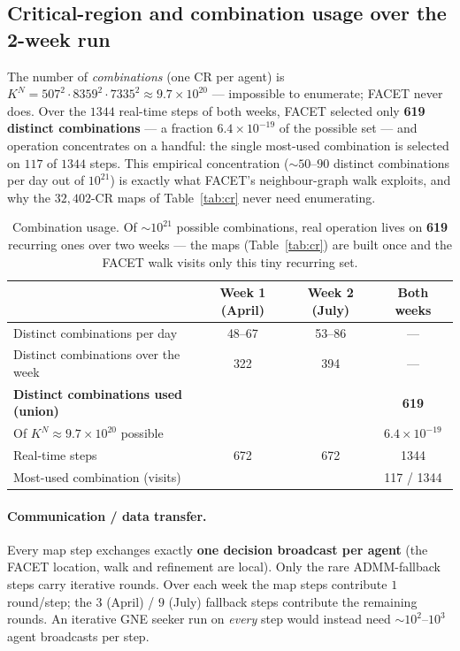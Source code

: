 \documentclass[11pt, letterpaper]{article}
\begin{document}
\subsection{Critical-region and combination usage over the 2-week run}
The number of \emph{combinations} (one CR per agent) is
$K^N=507^2\cdot8359^2\cdot7335^2\approx9.7\times10^{20}$ --- impossible to enumerate; FACET never
does. Over the $1344$ real-time steps of both weeks, FACET selected only \textbf{619 distinct
combinations} --- a fraction $6.4\times10^{-19}$ of the possible set --- and operation concentrates
on a handful: the single most-used combination is selected on $117$ of $1344$ steps. This empirical
concentration ($\sim\!50$--$90$ distinct combinations per day out of $10^{21}$) is exactly what
FACET's neighbour-graph walk exploits, and why the $32{,}402$-CR maps of Table~\ref{tab:cr} never
need enumerating.

\begin{table}[H]\centering
\begin{tabular}{lccc}
\toprule
& Week 1 (April) & Week 2 (July) & Both weeks\\
\midrule
Distinct combinations per day & 48--67 & 53--86 & ---\\
Distinct combinations over the week & 322 & 394 & ---\\
\textbf{Distinct combinations used (union)} & & & \textbf{619}\\
Of $K^N\approx9.7\times10^{20}$ possible & & & $6.4\times10^{-19}$\\
Real-time steps & 672 & 672 & 1344\\
Most-used combination (visits) & & & 117 / 1344\\
\bottomrule
\end{tabular}
\caption{Combination usage. Of $\sim\!10^{21}$ possible combinations, real operation lives on
\textbf{619} recurring ones over two weeks --- the maps (Table~\ref{tab:cr}) are built once and the
FACET walk visits only this tiny recurring set.}
\end{table}

\paragraph{Communication / data transfer.} Every map step exchanges exactly \textbf{one decision
broadcast per agent} (the FACET location, walk and refinement are local). Only the rare ADMM-fallback
steps carry iterative rounds. Over each week the map steps contribute $1$ round/step; the $3$
(April) / $9$ (July) fallback steps contribute the remaining rounds. An iterative GNE seeker
run on \emph{every} step would instead need $\sim\!10^2$--$10^3$ agent broadcasts per step.
\end{document}
